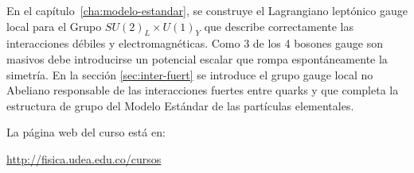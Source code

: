 
En el capítulo~\ref{cha:modelo-estandar}, se construye el Lagrangiano leptónico gauge local para el Grupo $SU(2)_L\times U(1)_Y$ que describe correctamente las interacciones débiles y electromagnéticas. Como 3 de los 4 bosones gauge son masivos debe introducirse un potencial escalar que rompa espontáneamente la simetría. En la sección \ref{sec:inter-fuert} se introduce el grupo gauge local no Abeliano responsable de las interacciones fuertes entre quarks y que completa la estructura de grupo del Modelo Estándar de las partículas elementales. 

La página web del curso está en:

\url{http://fisica.udea.edu.co/cursos}%





